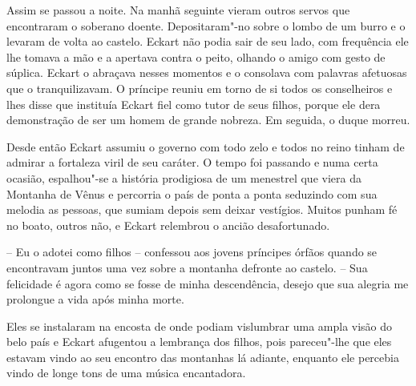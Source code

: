  Assim se passou a noite. Na manhã seguinte vieram outros servos que
encontraram o soberano doente. Depositaram"-no sobre o lombo de um burro
e o levaram de volta ao castelo. Eckart não podia sair de seu lado, com
frequência ele lhe tomava a mão e a apertava contra o peito, olhando o
amigo com gesto de súplica. Eckart o abraçava nesses momentos e o
consolava com palavras afetuosas que o tranquilizavam. O príncipe
reuniu em torno de si todos os conselheiros e lhes disse que instituía
Eckart fiel como tutor de seus filhos, porque ele dera demonstração de
ser um homem de grande nobreza. Em seguida, o duque morreu.

 Desde então Eckart assumiu o governo com todo zelo e todos no reino
tinham de admirar a fortaleza viril de seu caráter. O tempo foi
passando e numa certa ocasião, espalhou"-se a história prodigiosa de um
menestrel que viera da Montanha de Vênus e percorria o país de ponta a
ponta seduzindo com sua melodia as pessoas, que sumiam depois sem deixar
vestígios. Muitos punham fé no boato, outros não, e Eckart relembrou o
ancião desafortunado.

  -- Eu o adotei como filhos -- confessou aos jovens príncipes órfãos
quando se encontravam juntos uma vez sobre a montanha defronte ao
castelo. -- Sua felicidade é agora como se fosse de minha descendência,
desejo que sua alegria me prolongue a vida após minha morte.

 Eles se instalaram na encosta de onde podiam vislumbrar uma ampla visão
do belo país e Eckart afugentou a lembrança dos filhos, pois
pareceu"-lhe que eles estavam vindo ao seu encontro das montanhas lá
adiante, enquanto ele percebia vindo de longe tons de uma música
encantadora.

